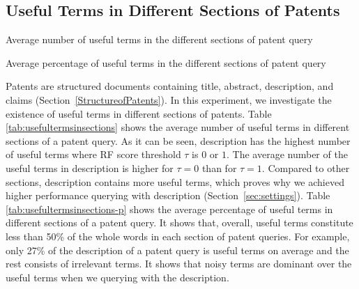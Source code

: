 \subsection{Useful Terms in Different Sections of Patents}
\begin{table}[t!]
  \begin{center}
   \caption{Average number of useful terms in the different sections of patent query}
     
  \label{tab:usefultermsinsections}
  \end{center}  
\end{table}
\begin{table}[t!]
  \begin{center}
   \caption{Average percentage of useful terms in the different sections of patent query}
     
  \label{tab:usefultermsinsections-p}
  \end{center}  
\end{table}
Patents are structured documents containing title, abstract, description, and claims (Section~\ref{StructureofPatents}). In this experiment, we investigate the existence of useful terms in different sections of patents. 
Table \ref{tab:usefultermsinsections} shows the average number of useful terms in different sections of a patent query.  
As it can be seen, description has the highest number of useful terms where RF score threshold $ \tau $ is $0$ or $1$. 
The average number of the useful terms in description is higher for $ \tau = 0 $ than for $ \tau = 1 $.
Compared to other sections, description contains more useful terms, which proves why we achieved higher performance querying with description (Section~\ref{sec:settings}).
Table \ref{tab:usefultermsinsections-p} shows the average percentage of useful terms in different sections of a patent query. It shows that, overall, useful terms constitute less than 50\% of the whole words in each section of patent queries. For example, only 27\% of the description of a patent query is useful terms on average and the rest consists of irrelevant terms. It shows that noisy terms are dominant over the useful terms when we querying with the description. 
